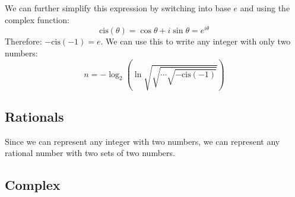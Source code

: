 \documentclass{article}
\begin{document}
We can further simplify this expression by switching into base $e$ and using the complex function:
\begin{equation}
    \mathrm{cis}(\theta) = \cos\theta + i\sin\theta = e^{i\theta}
\end{equation}
Therefore: $-\mathrm{cis}(-1)=e$. We can use this to write any integer with only two numbers:
\begin{equation}
    n = -\log_2\left( \ln \sqrt{\sqrt{\cdots\sqrt{-\mathrm{cis}(-1)}}}\right)
\end{equation}

\subsection{Rationals}
Since we can represent any integer with two numbers, we can represent any rational number with two sets of two numbers.

\subsection{Complex}
\end{document}
